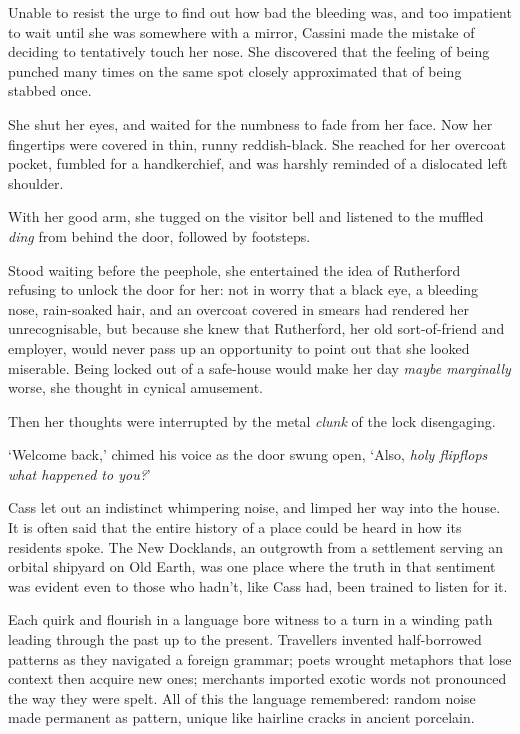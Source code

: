\newcommand{\foreign}[1]{\textit{#1}}
\newcommand{\robotic}[1]{{#1}}

Unable to resist the urge to find out how bad the bleeding was, and
too impatient to wait until she was somewhere with a mirror, Cassini
made the mistake of deciding to tentatively touch her nose. She
discovered that the feeling of being punched many times on the same
spot closely approximated that of being stabbed once.

She shut her eyes, and waited for the numbness to fade from her
face. Now her fingertips were covered in thin, runny
reddish-black. She reached for her overcoat pocket, fumbled for a
handkerchief, and was harshly reminded of a dislocated left
shoulder.

With her good arm, she tugged on the visitor bell and listened to the
muffled \textit{ding} from behind the door, followed by footsteps.

Stood waiting before the peephole, she entertained the idea of
Rutherford refusing to unlock the door for her: not in worry that a
black eye, a bleeding nose, rain-soaked hair, and an overcoat covered
in smears had rendered her unrecognisable, but because she knew that
Rutherford, her old sort-of-friend and employer, would never pass up
an opportunity to point out that she looked miserable. Being locked
out of a safe-house would make her day \emph{maybe marginally} worse,
she thought in cynical amusement.

Then her thoughts were interrupted by the metal \textit{clunk} of the
lock disengaging.

\robotic{`Welcome back,'} chimed his voice as the door swung
open, \robotic{`Also, \emph{holy flipflops what happened to you?}'}

Cass let out an indistinct whimpering noise, and limped her way into
the house.
\shorthline
It is often said that the entire history of a place could be heard in
how its residents spoke. The New Docklands, an outgrowth from a
settlement serving an orbital shipyard on Old Earth, was one place
where the truth in that sentiment was evident even to those who
hadn't, like Cass had, been trained to listen for it.

Each quirk and flourish in a language bore witness to a turn in a
winding path leading through the past up to the present. Travellers
invented half-borrowed patterns as they navigated a foreign grammar;
poets wrought metaphors that lose context then acquire new
ones; merchants imported exotic words not pronounced the way they were
spelt. All of this the language remembered: random noise
made permanent as pattern, unique like hairline cracks in ancient
porcelain.

